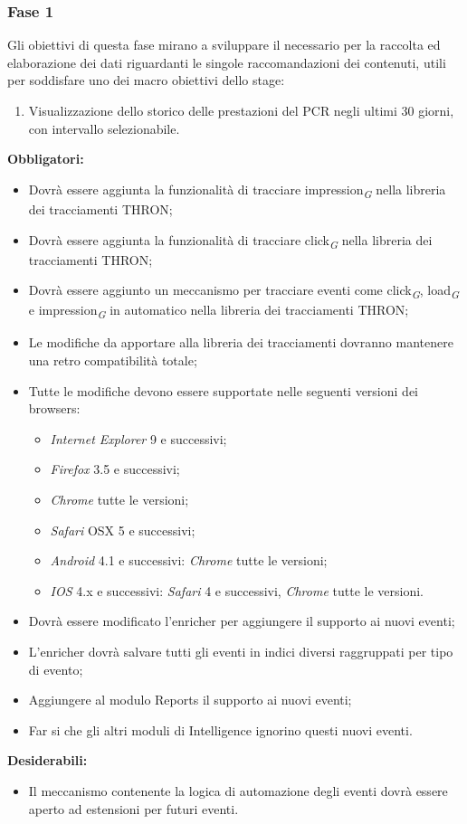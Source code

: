 \documentclass[a4paper, 12pt, twoside, openright]{book}
\newcommand{\gloss}[1]{#1\textsubscript{\textit{\tiny{G}}}}
\begin{document}
\subsubsection{Fase 1}
Gli obiettivi di questa fase mirano a sviluppare il necessario per la raccolta ed elaborazione dei dati riguardanti le singole raccomandazioni dei contenuti, utili per soddisfare uno dei macro obiettivi dello stage:
\begin{enumerate}
	\item Visualizzazione dello storico delle prestazioni del PCR negli ultimi 30 giorni, con intervallo selezionabile.
\end{enumerate}
\textbf{Obbligatori:}
\begin{itemize}
\item Dovrà essere aggiunta la funzionalità di tracciare \gloss{impression} nella libreria dei tracciamenti THRON;
\item Dovrà essere aggiunta la funzionalità di tracciare \gloss{click} nella libreria dei tracciamenti THRON;
\item Dovrà essere aggiunto un meccanismo per tracciare eventi come \gloss{click}, \gloss{load} e 	\gloss{impression} in automatico nella libreria dei tracciamenti THRON;
\item Le modifiche da apportare alla libreria dei tracciamenti dovranno mantenere una retro compatibilità totale;
\item Tutte le modifiche devono essere supportate nelle seguenti versioni dei browsers:
	\begin{itemize}
	\item \textit{Internet Explorer} 9 e successivi;
	\item \textit{Firefox} 3.5 e successivi;
	\item \textit{Chrome} tutte le versioni;
	\item \textit{Safari} OSX 5 e successivi;
	\item \textit{Android} 4.1 e successivi: \textit{Chrome} tutte le versioni;
	\item \textit{IOS} 4.x e successivi: \textit{Safari} 4 e successivi, \textit{Chrome} tutte le versioni.
	\end{itemize}
\item Dovrà essere modificato l'enricher per aggiungere il supporto ai nuovi eventi;
\item L'enricher dovrà salvare tutti gli eventi in indici diversi raggruppati per tipo di evento;
\item Aggiungere al modulo Reports il supporto ai nuovi eventi;
\item Far si che gli altri moduli di Intelligence ignorino questi nuovi eventi.
\end{itemize}
\textbf{Desiderabili:}
\begin{itemize}
\item Il meccanismo contenente la logica di automazione degli eventi dovrà essere aperto ad estensioni per futuri eventi.
\end{itemize}
\end{document}

